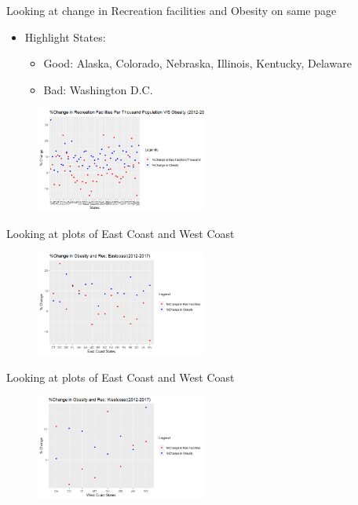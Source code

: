 \documentclass{beamer} %
\begin{document}
\begin{frame}{Looking at change in Recreation facilities and Obesity on same page}
  \begin{itemize}
   \item Highlight States:
   \begin{itemize}
    \item Good: Alaska, Colorado, Nebraska, Illinois, Kentucky, Delaware
    \item Bad: Washington D.C.
   \end {itemize}
  \end{itemize}
 \begin{figure}
   \includegraphics[width=0.5\textwidth]{ObesityRecPTH.png}
   \hfill
 \end{figure}
\end{frame}


\begin{frame}{Looking at plots of East Coast and West Coast}
  \begin{figure}
   \includegraphics[width=0.5\textwidth]{Eastplot.png}
   \hfill
  \end{figure}
\end{frame}

\begin{frame}{Looking at plots of East Coast and West Coast}
  \begin{figure}
   \includegraphics[width=0.5\textwidth]{Westplot.png}
   \hfill
  \end{figure}
\end{frame}
\end{document}
